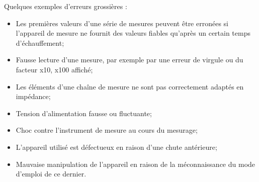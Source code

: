 Quelques exemples d'erreurs grossières :
\begin{itemize}
   \item Les premières valeurs d'une série de mesures peuvent être erronées si l'appareil de mesure ne fournit des valeurs fiables qu'après un certain temps d'échauffement;
   \item Fausse lecture d'une mesure, par exemple par une erreur de virgule ou du facteur x10, x100 affiché;
   \item Les éléments d'une chaîne de mesure ne sont pas correctement adaptés en impédance;
   \item Tension d'alimentation fausse ou fluctuante;
   \item Choc contre l'instrument de mesure au cours du mesurage;
   \item L'appareil utilisé est défectueux en raison d'une chute antérieure;
   \item Mauvaise manipulation de l'appareil en raison de la méconnaissance du mode d'emploi de ce dernier.
\end{itemize}

%

